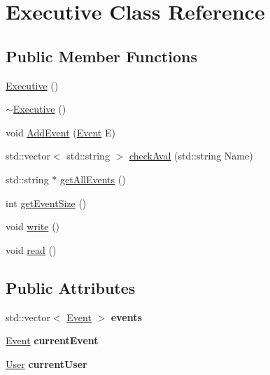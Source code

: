 \hypertarget{class_executive}{}\section{Executive Class Reference}
\label{class_executive}
\subsection*{Public Member Functions}
\begin{DoxyCompactItemize}
\item 
\mbox{\hyperlink{class_executive_ad870c1d741f1f313eb0c5a8336f8af6b}{Executive}} ()
\item 
\mbox{\hyperlink{class_executive_a4ce80c499f7640b1770ade77cf56d965}{$\sim$\+Executive}} ()
\item 
void \mbox{\hyperlink{class_executive_aa6ef4869740ffb4ad00da8e03524b757}{Add\+Event}} (\mbox{\hyperlink{class_event}{Event}} E)
\item 
std\+::vector$<$ std\+::string $>$ \mbox{\hyperlink{class_executive_a4099c9d7fba8038ef79df8daddf60f1e}{check\+Aval}} (std\+::string Name)
\item 
std\+::string $\ast$ \mbox{\hyperlink{class_executive_ada44e998fdc559eba9db2f4edeef0978}{get\+All\+Events}} ()
\item 
int \mbox{\hyperlink{class_executive_a325d611b8cd579647ee657c69560f28a}{get\+Event\+Size}} ()
\item 
void \mbox{\hyperlink{class_executive_a49841644378cd9bb4b8c1cc2eee04003}{write}} ()
\item 
void \mbox{\hyperlink{class_executive_a222ab3a86234f7476e769a285bf566a4}{read}} ()
\end{DoxyCompactItemize}
\subsection*{Public Attributes}
\begin{DoxyCompactItemize}
\item 
\mbox{\label{class_executive_a63df728eed3bdfd798e943d41d052f2d}} 
std\+::vector$<$ \mbox{\hyperlink{class_event}{Event}} $>$ {\bfseries events}
\item 
\mbox{\label{class_executive_afc5d32a44263c70d0795765fc238b343}} 
\mbox{\hyperlink{class_event}{Event}} {\bfseries current\+Event}
\item 
\mbox{\label{class_executive_a6396a22945149d9e698ac1e5d8312d93}} 
\mbox{\hyperlink{class_user}{User}} {\bfseries current\+User}
\end{DoxyCompactItemize}
